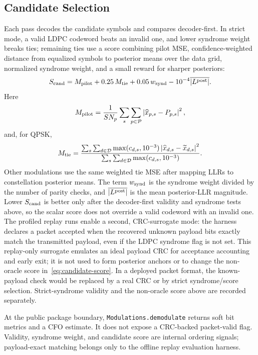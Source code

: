 \documentclass[journal]{IEEEtran}
\newcommand{\abs}[1]{\left\lvert #1 \right\rvert}
\begin{document}
\subsection{Candidate Selection}\label{ssec:candidate-selection}
\label{ssec:solver-selection}
Each pass decodes the candidate symbols and compares decoder-first. In strict
mode, a valid LDPC codeword beats an invalid one, and lower syndrome weight
breaks ties; remaining ties use a score combining pilot MSE,
confidence-weighted distance from equalized symbols to posterior means over the
data grid,
normalized syndrome weight, and a small reward for sharper posteriors:
\begin{equation}
  S_{\rm cand}
  =M_{\rm pilot}+0.25\,M_{\rm tie}
   +0.05\,w_{\rm synd}-10^{-4}\overline{|L^{\rm post}|}.
  \label{eq:candidate-score}
\end{equation}
Here
\begin{equation}
  M_{\rm pilot}
  =\frac{1}{SN_p}\sum_{s}\sum_{p\in\mathcal P}
    \abs{\widehat x_{p,s}-P_{p,s}}^2,
  \label{eq:candidate-pilot-mse}
\end{equation}
and, for QPSK,
\begin{equation}
  M_{\rm tie}
  =\frac{\sum_{s}\sum_{d\in\mathcal D}\max(c_{d,s},10^{-3})
          \abs{\widehat x_{d,s}-\widetilde x_{d,s}}^2}
         {\sum_{s}\sum_{d\in\mathcal D}\max(c_{d,s},10^{-3})}.
  \label{eq:candidate-tie-mse}
\end{equation}
Other modulations use the same weighted tie MSE after mapping LLRs to
constellation posterior means. The term $w_{\rm synd}$ is the syndrome weight
divided by the number of parity checks, and
$\overline{|L^{\rm post}|}$ is the mean posterior-LLR magnitude. Lower
$S_{\rm cand}$ is better only after the decoder-first validity and syndrome
tests above, so the scalar score does not override a valid codeword with an
invalid one. The profiled replay runs enable a second, CRC-surrogate mode: the
harness declares a packet accepted when the recovered unknown payload bits
exactly match the transmitted payload, even if the LDPC syndrome flag is not set.
This replay-only surrogate emulates an ideal payload CRC for acceptance
accounting and early exit; it is not used to form posterior anchors or to change
the non-oracle score in~\eqref{eq:candidate-score}. In a deployed packet format,
the known-payload check would be replaced by a real CRC or by strict
syndrome/score selection. Strict-syndrome validity and the non-oracle score above
are recorded separately.

At the public package boundary, \texttt{Modulations.demodulate} returns
soft bit metrics and a CFO estimate. It does not expose a CRC-backed packet-valid flag.
Validity, syndrome weight, and candidate score are internal ordering signals;
payload-exact matching belongs only to the offline replay evaluation harness.
\end{document}
